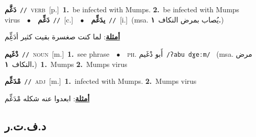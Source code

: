 \documentclass[10pt,a4paper,twoside]{article} %
\begin{document}
\begin{multicols}{2}
{\setlength\topsep{0pt}\textbf{\foreignlanguage{arabic}{دَغَّم}}\ {\color{gray}\texttt{//}\color{black}}\ \textsc{verb}\ [p.]\ \textbf{1.}~be infected with Mumps.  \textbf{2.}~be infected with Mumps virus\ \ $\bullet$\ \ \setlength\topsep{0pt}\textbf{\foreignlanguage{arabic}{دَغِّم}}\ {\color{gray}\texttt{//}\color{black}}\ [c.]\ \ $\bullet$\ \ \setlength\topsep{0pt}\textbf{\foreignlanguage{arabic}{يدَغِّم}}\ {\color{gray}\texttt{//}\color{black}}\ [i.]\ \color{gray}(msa. \foreignlanguage{arabic}{يُصاب بمرض النكاف}~\foreignlanguage{arabic}{\textbf{١.}})\color{black}\  \begin{flushright}\color{gray}\foreignlanguage{arabic}{\textbf{\underline{\foreignlanguage{arabic}{أمثلة}}}: لما كنت صغسرة بقيت كثير أدَغِِّم}\end{flushright}\color{black}} \vspace{2mm}

{\setlength\topsep{0pt}\textbf{\foreignlanguage{arabic}{دْغَيم}}\ {\color{gray}\texttt{//}\color{black}}\ \textsc{noun}\ [m.]\ \textbf{1.}~see phrase\ \ $\bullet$\ \ \textsc{ph.} \color{gray} \foreignlanguage{arabic}{أَبو دْغَيم}\color{black}\ {\color{gray}\texttt{/{\sffamily ʔabu dɣeːm}/}\color{black}}\ \color{gray} (msa. \foreignlanguage{arabic}{مرض النكاف}~\foreignlanguage{arabic}{\textbf{١.}})\color{black}\ \textbf{1.}~Mumps  \textbf{2.}~Mumps virus\ } \vspace{2mm}

{\setlength\topsep{0pt}\textbf{\foreignlanguage{arabic}{مْدَغِّم}}\ {\color{gray}\texttt{//}\color{black}}\ \textsc{adj}\ [m.]\ \textbf{1.}~infected with Mumps.  \textbf{2.}~Mumps virus\  \begin{flushright}\color{gray}\foreignlanguage{arabic}{\textbf{\underline{\foreignlanguage{arabic}{أمثلة}}}: ابعدوا عنه شكله مْدَغِّم}\end{flushright}\color{black}} \vspace{2mm}

\vspace{-3mm}
\subsection*{\color{blue}\foreignlanguage{arabic}{د.ف.ت.ر}\color{blue}{}} 


\end{multicols}
\end{document}
